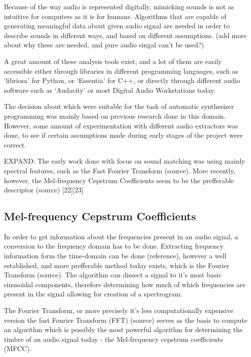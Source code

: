 Because of the way audio is represented digitally, mimicking
sounds is not as intuitive for computers as it is for
humans. Algorithms that are capable of generating meaningful data
about given audio signal are needed in order to describe sounds in
different ways, and based on different assumptions. (add more about
why these are needed, and pure audio singal can't be used?)

A great amount of these analysis tools exist, and a lot of them are
easily accessible either through libraries in different programming
languages, such as `libriosa'\cite{noauthor_librosa_nodate} for
Python, or `Essentia'\cite{noauthor_homepage_nodate} for C++, or
directly through different audio software such as
`Audacity'\cite{noauthor_audacity_nodate} or most Digital Audio
Workstations today.

The decision about which were suitable for the task of automatic
synthesizer programming was mainly based on previous research done in
this domain. However, some amount of experimentation with different
audio extractors was done, to see if certain assumptions made during
early stages of the project were correct.

EXPAND:
The early work done with focus on sound matching was using mainly
spectral features, such as the Fast Fourier Transform (source). More
recently, however, the Mel-frequency Cepstrum Coefficients seem to be
the prefferable descriptor (source) [22][23]

\subsection{Mel-frequency Cepstrum Coefficients}

In order to get information about the frequencies present in an audio
signal, a conversion to the frequency domain has to be
done. Extracting frequency information form the time-domain can be
done (reference), however a well established, and more prefferable
method today exists, which is the Fourier Transform (source). The
algorithm can dissect a signal to it's most basic sinusoidal
components, therefore determining how much of which frequencies are
present in the signal allowing for creation of a spectrogram.

The Fourier Transform, or more precisely it's less computationally
expensive version the fast Fourier Transform (FFT) (source) serves as
the basis to compute an algorithm which is possibly the most powerful
algorithm for determining the timbre of an audio signal today - the
Mel-frequency cepstrum coefficients (MFCC).

